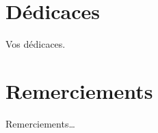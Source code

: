 \chapter*{Dédicaces}

\vspace{2cm}
\hspace{2.5cm}Vos dédicaces.

\chapter*{Remerciements}

\noindent Remerciements\dots


\NoChapterPageNumber 


